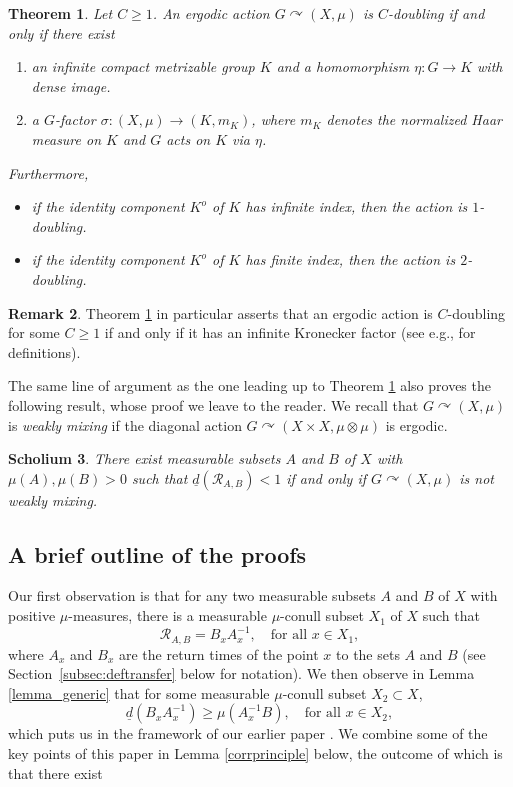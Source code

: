 \documentclass[11pt]{article}
\newcommand{\eg}{e.g.,\xspace}
\numberwithin{equation}{section}
\let\mathcal\mathscr
\newcommand{\cR}{\mathcal{R}}
\let\acts\curvearrowright
\theoremstyle{plain}
\newtheorem{theorem}{Theorem}[section]
\newtheorem{scholium}[theorem]{Scholium}
\theoremstyle{definition}
\newtheorem{remark}[theorem]{Remark}
\begin{document}
\begin{theorem}
\label{thm4}
Let $C \geq 1$. An ergodic action $G \acts (X,\mu)$ is $C$\nobreakdash-doubling if and only if there exist

\begin{enumerate}
\item
an infinite compact metrizable group $K$ and a homomorphism $\eta : G \to K$ with dense image.
\item
a $G$-factor $\sigma : (X,\mu) \to (K,m_K)$, where $m_K$ denotes the normalized Haar measure on $K$
and $G$ acts on $K$ via $\eta$.
\end{enumerate}
Furthermore,

\begin{itemize}
\item if the identity component $K^o$ of $K$ has infinite index, then the action is $1$\nobreakdash-doubling.

\item if the identity component $K^o$ of $K$ has finite index, then the action is $2$\nobreakdash-doubling.
\end{itemize}
\end{theorem}

\begin{remark}
Theorem \ref{thm4} in particular asserts that an ergodic action is $C$\nobreakdash-doubling for some $C \geq 1$ if and only if it has an infinite Kronecker
factor (see \eg \cite{BF} for definitions).
\end{remark}

The same line of argument as the one leading up to Theorem \ref{thm4} also proves the following result, whose proof we leave to the reader.
We recall that $G \acts (X,\mu)$ is \emph{weakly mixing} if the diagonal action $G \acts (X \times X,\mu \otimes \mu)$ is ergodic.

\begin{scholium}
There exist measurable subsets $A$ and $B$ of $X$ with $\mu(A),\mu(B) > 0$ such that $\underline{d}(\cR_{A,B}) < 1$ if and only if $G \acts (X,\mu)$ is \emph{not}
weakly mixing.
\end{scholium}

\subsection{A brief outline of the proofs}

Our first observation is that for any two measurable subsets $A$ and $B$ of $X$ with positive $\mu$-measures, there is a measurable
$\mu$-conull subset $X_1$ of $X$ such that
\[
\cR_{A,B} = B_x A_x^{-1}, \quad \textrm{for all $x \in X_1$},
\]
where $A_x$ and $B_x$ are the return times of the point $x$ to the sets $A$ and $B$ (see Section~\ref{subsec:deftransfer} below for notation).
We then observe in Lemma \ref{lemma_generic} that for some measurable $\mu$-conull subset $X_2 \subset X$,
\[
\underline{d}(B_xA_x^{-1}) \geq \mu(A_x^{-1}B), \quad \textrm{for all $x \in X_2$},
\]
which puts us in the framework of our earlier paper \cite{BF}. We combine some of the key points of this paper in Lemma \ref{corrprinciple}
below, the outcome of which is that there exist
\end{document}
